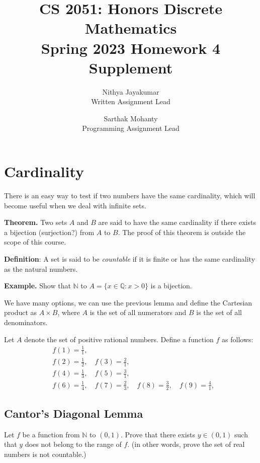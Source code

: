 \documentclass{article}
\title{\vspace{-1cm}CS 2051: Honors Discrete Mathematics \\Spring 2023 Homework 4 Supplement}
\author{Nithya Jayakumar \\ \small{Written Assignment Lead}
\and Sarthak Mohanty \\ \small{Programming Assignment Lead}}
\date{}
\begin{document}
\maketitle

\section*{Cardinality}
    
    There is an easy way to test if two numbers have the same cardinality, which will become useful when we deal with infinite sets.
    
    \vspace{1.5mm}
    \textbf{Theorem.} Two sets $A$ and $B$ are said to have the same cardinality if there exists a bijection (surjection?) from $A$ to $B$. The proof of this theorem is outside the scope of this course.
    
    \vspace{1.5mm}
    \textbf{Definition}: A set is said to be \textit{countable} if it is finite or has the same cardinality as the natural numbers.

    
    \textbf{Example.} 
    Show that $\mathbb{N}$ to $A = \{x \in \mathbb{Q}: x > 0\}$ is a bijection.
    
    We have many options, we can use the previous lemma and define the Cartesian product as $A \times B$, where $A$ is the set of all numerators and $B$ is the set of all denominators.
    
    
    Let $A$ denote the set of positive rational numbers. Define a function $f$ as follows:
    \begin{align*}
        & f(1) = \frac{1}{1}, \\
        & f(2) = \frac{1}{2}, \quad f(3) = \frac{2}{1}, \\
        & f(4) = \frac{1}{3}, \quad f(5) = \frac{3}{1}, \\
        & f(6) = \frac{1}{4}, \quad f(7) = \frac{2}{3}, \quad f(8) = \frac{3}{2}, \quad f(9) = \frac{4}{1},
    \end{align*}

\subsection*{Cantor's Diagonal Lemma}
    Let $f$ be a function from $\mathbb{N}$ to $(0, 1)$. Prove that there exists $y \in (0, 1)$ such that $y$ does not belong to the range of $f$. (in other words, prove the set of real numbers is not countable.)
\end{document}
